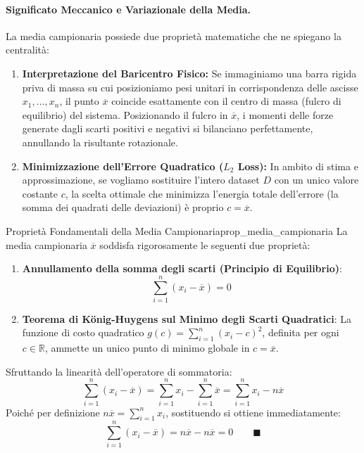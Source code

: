 \paragraph{Significato Meccanico e Variazionale della Media.}
La media campionaria possiede due proprietà matematiche che ne spiegano la centralità:
\begin{enumerate}
    \item \textbf{Interpretazione del Baricentro Fisico:} Se immaginiamo una barra rigida priva di massa su cui posizioniamo pesi unitari in corrispondenza delle ascisse $x_1, \dots, x_n$, il punto $\overline{x}$ coincide esattamente con il centro di massa (fulcro di equilibrio) del sistema. Posizionando il fulcro in $\overline{x}$, i momenti delle forze generate dagli scarti positivi e negativi si bilanciano perfettamente, annullando la risultante rotazionale.
    \item \textbf{Minimizzazione dell'Errore Quadratico ($L_2$ Loss):} In ambito di stima e approssimazione, se vogliamo sostituire l'intero dataset $D$ con un unico valore costante $c$, la scelta ottimale che minimizza l'energia totale dell'errore (la somma dei quadrati delle deviazioni) è proprio $c = \overline{x}$.
\end{enumerate}

\begin{teorema}{Proprietà Fondamentali della Media Campionaria}{prop_media_campionaria}
La media campionaria $\overline{x}$ soddisfa rigorosamente le seguenti due proprietà:
\begin{enumerate}
    \item \textbf{Annullamento della somma degli scarti (Principio di Equilibrio)}:
    \begin{equation}
    \sum_{i=1}^n (x_i - \overline{x}) = 0
    \end{equation}
    \item \textbf{Teorema di König-Huygens sul Minimo degli Scarti Quadratici}:
    La funzione di costo quadratico $g(c) = \sum_{i=1}^n (x_i - c)^2$, definita per ogni $c \in \mathbb{R}$, ammette un unico punto di minimo globale in $c = \overline{x}$.
\end{enumerate}
\end{teorema}

\begin{dimostrazione}
Sfruttando la linearità dell'operatore di sommatoria:
\begin{equation}
\sum_{i=1}^n (x_i - \overline{x}) = \sum_{i=1}^n x_i - \sum_{i=1}^n \overline{x} = \sum_{i=1}^n x_i - n\overline{x}
\end{equation}
Poiché per definizione $n\overline{x} = \sum_{i=1}^n x_i$, sostituendo si ottiene immediatamente:
\begin{equation}
\sum_{i=1}^n (x_i - \overline{x}) = n\overline{x} - n\overline{x} = 0 \qquad \blacksquare
\end{equation}
\end{dimostrazione}

